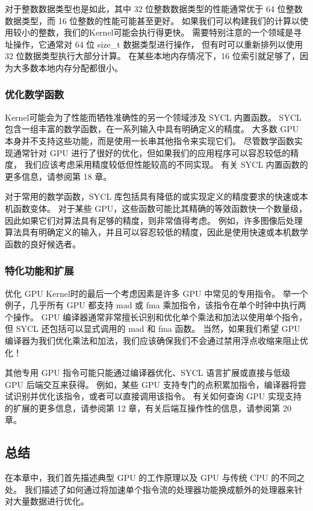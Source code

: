 对于整数数据类型也是如此，其中 32 位整数数据类型的性能通常优于 64 位整数数据类型，而 16 位整数的性能可能甚至更好。 
如果我们可以构建我们的计算以使用较小的整数，我们的Kernel可能会执行得更快。 
需要特别注意的一个领域是寻址操作，它通常对 64 位 size\_t 数据类型进行操作，
但有时可以重新排列以使用 32 位数据类型执行大部分计算。 
在某些本地内存情况下，16 位索引就足够了，因为大多数本地内存分配都很小。

\subsubsection{优化数学函数}
Kernel可能会为了性能而牺牲准确性的另一个领域涉及 SYCL 内置函数。 
SYCL 包含一组丰富的数学函数，在一系列输入中具有明确定义的精度。 
大多数 GPU 本身并不支持这些功能，而是使用一长串其他指令来实现它们。 
尽管数学函数实现通常针对 GPU 进行了很好的优化，但如果我们的应用程序可以容忍较低的精度，
我们应该考虑采用精度较低但性能较高的不同实现。 有关 SYCL 内置函数的更多信息，请参阅第 18 章。

对于常用的数学函数，SYCL 库包括具有降低的或实现定义的精度要求的快速或本机函数变体。 
对于某些 GPU，这些函数可能比其精确的等效函数快一个数量级，因此如果它们对算法具有足够的精度，则非常值得考虑。 
例如，许多图像后处理算法具有明确定义的输入，并且可以容忍较低的精度，因此是使用快速或本机数学函数的良好候选者。

\subsubsection{特化功能和扩展}
优化 GPU Kernel时的最后一个考虑因素是许多 GPU 中常见的专用指令。 
举一个例子，几乎所有 GPU 都支持 mad 或 fma 乘加指令，该指令在单个时钟中执行两个操作。 
GPU 编译器通常非常擅长识别和优化单个乘法和加法以使用单个指令，但 SYCL 还包括可以显式调用的 mad 和 fma 函数。 
当然，如果我们希望 GPU 编译器为我们优化乘法和加法，我们应该确保我们不会通过禁用浮点收缩来阻止优化！

其他专用 GPU 指令可能只能通过编译器优化、SYCL 语言扩展或直接与低级 GPU 后端交互来获得。 
例如，某些 GPU 支持专门的点积累加指令，编译器将尝试识别并优化该指令，或者可以直接调用该指令。 
有关如何查询 GPU 实现支持的扩展的更多信息，请参阅第 12 章，有关后端互操作性的信息，请参阅第 20 章。

\subsection{总结}
在本章中，我们首先描述典型 GPU 的工作原理以及 GPU 与传统 CPU 的不同之处。 
我们描述了如何通过将加速单个指令流的处理器功能换成额外的处理器来针对大量数据进行优化。

